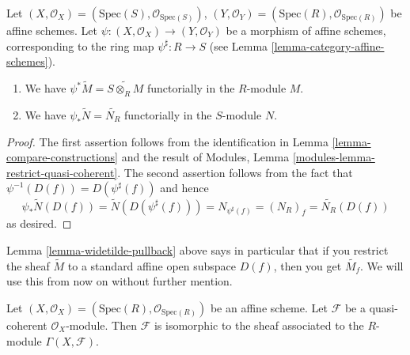 \begin{lemma}
\label{lemma-widetilde-pullback}
Let
$(X, \mathcal{O}_X) = (\text{Spec}(S), \mathcal{O}_{\text{Spec}(S)})$,
$(Y, \mathcal{O}_Y) = (\text{Spec}(R), \mathcal{O}_{\text{Spec}(R)})$
be affine schemes.
Let $\psi : (X, \mathcal{O}_X) \to (Y, \mathcal{O}_Y)$ be a
morphism of affine schemes, corresponding to the ring map
$\psi^\sharp : R \to S$ (see Lemma \ref{lemma-category-affine-schemes}).
\begin{enumerate}
\item We have $\psi^* \widetilde M = \widetilde{S\otimes_R M}$
functorially in the $R$-module $M$.
\item We have $\psi_* \widetilde N = \widetilde{N_R}$ functorially
in the $S$-module $N$.
\end{enumerate}
\end{lemma}

\begin{proof}
The first assertion follows from the identification in
Lemma \ref{lemma-compare-constructions}
and the result of Modules, Lemma \ref{modules-lemma-restrict-quasi-coherent}.
The second assertion follows from the fact
that $\psi^{-1}(D(f)) = D(\psi^\sharp(f))$ and hence
$$
\psi_* \widetilde N(D(f)) = \widetilde N(D(\psi^\sharp(f))) =
N_{\psi^\sharp(f)} = (N_R)_f = \widetilde{N_R}(D(f))
$$
as desired.
\end{proof}

\noindent
Lemma \ref{lemma-widetilde-pullback} above says in particular
that if you restrict
the sheaf $\widetilde M$ to a standard affine open subspace
$D(f)$, then you get $\widetilde{M_f}$. We will use this from
now on without further mention.

\begin{lemma}
\label{lemma-quasi-coherent-affine}
Let $(X, \mathcal{O}_X) = (\text{Spec}(R), \mathcal{O}_{\text{Spec}(R)})$
be an affine scheme. Let $\mathcal{F}$ be a
quasi-coherent $\mathcal{O}_X$-module. Then
$\mathcal{F}$ is isomorphic to the sheaf associated to
the $R$-module $\Gamma(X, \mathcal{F})$.
\end{lemma}

